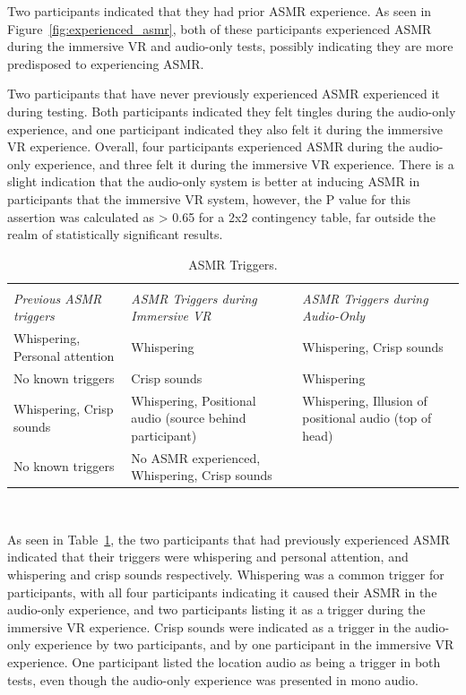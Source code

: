 \documentclass{sigchi}
\begin{document}
Two participants indicated that they had prior ASMR experience. As seen in Figure~\ref{fig:experienced_asmr}, both of these participants experienced ASMR during the immersive VR and audio-only tests, possibly indicating they are more predisposed to experiencing ASMR. 

Two participants that have never previously experienced ASMR experienced it during testing. Both participants indicated they felt tingles during the audio-only experience, and one participant indicated they also felt it during the immersive VR experience. Overall, four participants experienced ASMR during the audio-only experience, and three felt it during the immersive VR experience. There is a slight indication that the audio-only system is better at inducing ASMR in participants that the immersive VR system, however, the P value for this assertion was calculated as > 0.65 for a 2x2 contingency table, far outside the realm of statistically significant results.

\begin{table}[htb]
  \centering
  \begin{tabular}{p{6cm} p{6cm} p{6cm}}
    \toprule\\
    {\textit{Previous ASMR triggers}} & {\textit{ASMR Triggers during Immersive VR}} & {\textit{ASMR Triggers during Audio-Only}}\\
    \midrule
    Whispering, Personal attention & Whispering & Whispering, Crisp sounds \\
    No known triggers & Crisp sounds & Whispering \\
    Whispering, Crisp sounds & Whispering, Positional audio (source behind participant) & Whispering, Illusion of positional audio (top of head)\\
    No known triggers & No ASMR experienced, Whispering, Crisp sounds\\
     \bottomrule
  \end{tabular}
  \caption{ASMR Triggers.}~\label{tab:triggers}
\end{table}

As seen in Table~\ref{tab:triggers}, the two participants that had previously experienced ASMR indicated that their triggers were whispering and personal attention, and whispering and crisp sounds respectively. Whispering was a common trigger for participants, with all four participants indicating it caused their ASMR in the audio-only experience, and two participants listing it as a trigger during the immersive VR experience. Crisp sounds were indicated as a trigger in the audio-only experience by two participants, and by one participant in the immersive VR experience. One participant listed the location audio as being a trigger in both tests, even though the audio-only experience was presented in mono audio.
\end{document}
